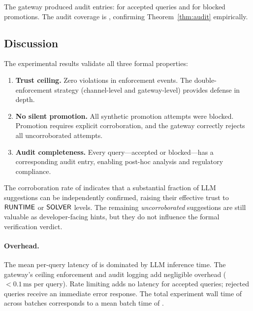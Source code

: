 \documentclass[11pt]{article}
\begin{document}
The gateway produced \ppLXXXVIIIauditEntries{} audit entries:
\ppLXXXVIIIauditQueries{} for accepted queries and
\ppLXXXVIIIauditBlocked{} for blocked promotions.  The audit
coverage is \ppLXXXVIIIauditComplete, confirming
Theorem~\ref{thm:audit} empirically.

\subsection{Discussion}
\label{sec:exp:discussion}

The experimental results validate all three formal properties:

\begin{enumerate}
\item \textbf{Trust ceiling.}
  Zero violations in \ppLXXXVIIIceilingEvents{} enforcement
  events.  The double-enforcement strategy (channel-level and
  gateway-level) provides defense in depth.

\item \textbf{No silent promotion.}
  All \ppLXXXVIIIpromotionAttempts{} synthetic promotion
  attempts were blocked.  Promotion requires explicit
  corroboration, and the gateway correctly rejects all
  uncorroborated attempts.

\item \textbf{Audit completeness.}
  Every query---accepted or blocked---has a corresponding audit
  entry, enabling post-hoc analysis and regulatory compliance.
\end{enumerate}

The corroboration rate of \ppLXXXVIIIcorrobRate{} indicates that
a substantial fraction of LLM suggestions can be independently
confirmed, raising their effective trust to $\mathsf{RUNTIME}$ or
$\mathsf{SOLVER}$ levels.  The remaining \emph{uncorroborated}
suggestions are still valuable as developer-facing hints, but
they do not influence the formal verification verdict.

\paragraph{Overhead.}
The mean per-query latency of \ppLXXXVIIIlatencyMeanMs{} is
dominated by LLM inference time.  The gateway's ceiling
enforcement and audit logging add negligible overhead
($< 0.1\,\text{ms}$ per query).  Rate limiting adds no
latency for accepted queries; rejected queries receive an
immediate error response.  The total experiment wall time of
\ppLXXXVIIItimeTotal{} across \ppLXXXVIIIqueryBatches{} batches
corresponds to a mean batch time of \ppLXXXVIIItimeMeanBatch.
\end{document}
